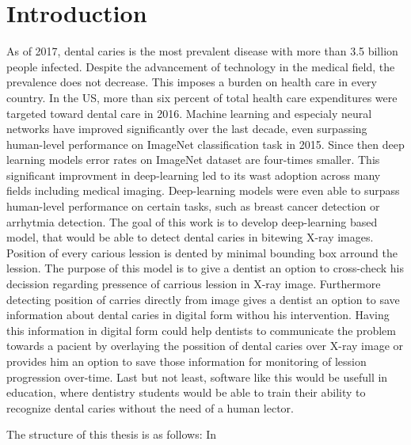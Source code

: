 \chapter{Introduction}

As of 2017, dental caries is the most prevalent disease \cite{Kassebaum2015}\cite{James2018} with more than 3.5 billion people infected. Despite the advancement of technology in the medical field, the prevalence does not decrease. This imposes a burden on health care in every country. In the US, more than six percent of total health care expenditures were targeted toward dental care in 2016\cite{Hung2020}.
\newline
Machine learning and especialy neural networks have improved significantly over the last decade, even surpassing human-level performance on ImageNet classification task in 2015\cite{He2015ICCV}. Since then deep learning models error rates on ImageNet dataset are four-times smaller\cite{paperwithcode}. This significant improvment in deep-learning led to its wast adoption across many fields including medical imaging. Deep-learning models were even able to surpass human-level performance on certain tasks, such as breast cancer detection\cite{RodriguezRuiz2019} or arrhytmia detection\cite{Hannun2019}.
\newline
The goal of this work is to develop deep-learning based model, that would be able to detect dental caries in bitewing X-ray images. Position of every carious lession is dented by minimal bounding box arround the lession. The purpose of this model is to give a dentist an option to cross-check his decission regarding pressence of carrious lession in X-ray image. Furthermore detecting position of carries directly from image gives a dentist an option to save information about dental caries in digital form withou his intervention. Having this information in digital form could help dentists to communicate the problem towards a pacient by overlaying the possition of dental caries over X-ray image or provides him an option to save those information for monitoring of lession progression over-time. Last but not least, software like this would be usefull in education, where dentistry students would be able to train their ability to recognize dental caries without the need of a human lector.

The structure of this thesis is as follows: In
